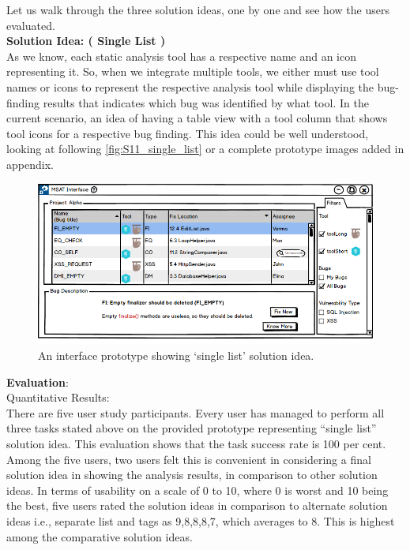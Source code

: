 Let us walk through the three solution ideas, one by one and see how the users evaluated. \\

\textbf{Solution Idea: ( Single List )} \\

As we know, each static analysis tool has a respective name and an icon representing it. So, when we integrate multiple tools, we either must use tool names or icons to represent the respective analysis tool while displaying the bug-finding results that indicates which bug was identified by what tool. In the current scenario, an idea of having a table view with a tool column that shows tool icons for a respective bug finding. This idea could be well understood, looking at following \autoref{fig:S11_single_list} or a complete prototype images added in appendix. \\

\begin{figure}[hbt!]
	\centering
	\includegraphics[width=\linewidth]{figures/solution_ideas_snaps/S11_single_list}
	\caption{An interface prototype showing ‘single list’ solution idea.}
	\label{fig:S11_single_list}
\end{figure}


\textbf{Evaluation}: \\

Quantitative Results: \\

There are five user study participants. Every user has managed to perform all three tasks stated above on the provided prototype representing “single list” solution idea. This evaluation shows that the task success rate is 100 per cent. \\

Among the five users, two users felt this is convenient in considering a final solution idea in showing the analysis results, in comparison to other solution ideas.  In terms of usability on a scale of 0 to 10, where 0 is worst and 10 being the best, five users rated the solution ideas in comparison to alternate solution ideas i.e., separate list and tags as 9,8,8,8,7, which averages to 8. This is highest among the comparative solution ideas. \\

